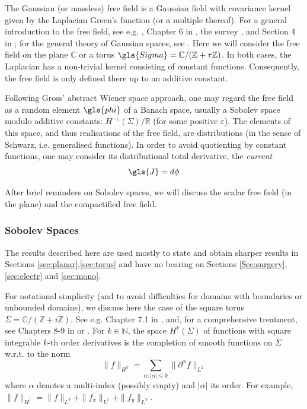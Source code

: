 \documentclass[10pt]{article}
\newcommand{\Z}{\mathbb{Z}}
\newcommand{\R}{\mathbb{R}}
\newcommand{\N}{\mathbb{N}}
\newcommand{\C}{\mathbb{C}}
\newcommand{\eps}{\varepsilon}
\begin{document}
The Gaussian (or massless) free field is a Gaussian field with covariance kernel given by the Laplacian Green's function (or a multiple thereof). For a general introduction to the free field, see e.g. \cite{Simon_Pphi}, Chapter 6 in \cite{Glimm_Jaffe}, the survey \cite{She_GFFmath}, and Section 4 in \cite{Dub_SLEGFF}; for the general theory of Gaussian spaces, see \cite{Janson}. Here we will consider the free field on the plane $\C$ or a torus $\gls{Sigma}=\C/(\Z+\tau\Z)$. In both cases, the Laplacian has a non-trivial kernel consisting of constant functions. Consequently, the free field is only defined there up to an additive constant.

Following Gross' abstract Wiener space approach, one may regard the free field as a random element $\gls{phi}$ of a Banach space, usually a Sobolev space modulo additive constants: $H^{-\eps}(\Sigma)/\R$ (for some positive $\eps$). The elements of this space, and thus realisations of the free field, are distributions (in the sense of Schwarz, i.e. generalised functions). In order to avoid quotienting by constant functions, one may consider its distributional total derivative, the {\em current} 
\begin{equation}\label{eq:currentdef}
\gls{J}=d\phi
\end{equation}

After brief reminders on Sobolev spaces, we will discuss the scalar free field (in the plane) and the compactified free field.


\subsubsection{Sobolev Spaces}\label{ssec:Sobolev}

The results described here are used mostly to state and obtain sharper results in Sections \ref{sec:planar},\ref{sec:torus} and have no bearing on Sections \ref{Sec:surgery}, \ref{sec:electr} and \ref{sec:mono}.

For notational simplicity (and to avoid difficulties for domains with boundaries or unbounded domains), we discuss here the case of the square torus $\Sigma=\C/(\Z+i\Z)$. See e.g. Chapter 7.1 in \cite{Stroock_PDEs}, and, for a comprehensive treatment, see Chapters 8-9 in \cite{Brezis} or \cite{Adams_Sobolev}. For $k\in\N$, the space $H^k(\Sigma)$ of functions with square integrable $k$-th order derivatives is the completion of smooth functions on $\Sigma$ w.r.t. to the norm
$$\|f\|_{H^k}=\sum_{\alpha:|\alpha|\leq k}\|\partial^{\alpha}f\|_{L^2}$$
where $\alpha$ denotes a multi-index (possibly empty) and $|\alpha|$ its order. For example, $\|f\|_{H^1}=\|f\|_{L^2}+\|f_x\|_{L^2}+\|f_y\|_{L^2}$. 
\end{document}
